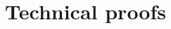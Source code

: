 \documentclass{article}
\newcommand{\radphi}{b_{\phi}}
\newcommand{\scorefunc}{s}
\newcommand{\scoreval}{\scorefunc}
\newcommand{\scorerv}{S}
\begin{document}


\section{Technical proofs}
\end{document}
